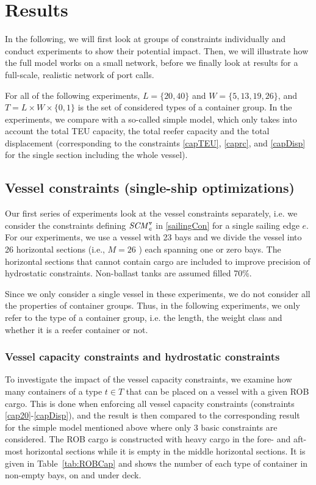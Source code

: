 \section{Results}
In the following, we will first look at groups of constraints individually and conduct experiments to show their potential impact. Then, we will illustrate how the full model works on a small network, before we finally look at results for a full-scale, realistic network of port calls.  

For all of the following experiments, $L=\{20,40\}$ and $W = \{5,13,19,26\}$, and $T=L\times W\times \{0,1\}$ is the set of considered types of a container group. 
In the experiments, we compare with a so-called simple model, which only takes into account the total TEU capacity, the total reefer capacity and the total displacement (corresponding to the constraints \eqref{capTEU}, \eqref{caprc}, and \eqref{capDisp} for the single section including the whole vessel).

\subsection{Vessel constraints (single-ship optimizations)}
Our first series of experiments look at the vessel constraints separately, i.e. we consider the constraints defining $\mathit{SCM}^\texttt{v}_{e}$ in \eqref{sailingCon} for a single sailing edge $e$. 
For our experiments, we use a vessel with 23 bays and we divide the vessel into 26 horizontal sections (i.e., $M = 26$ ) each spanning one or zero bays. The horizontal sections that cannot contain cargo are included to improve precision of hydrostatic constraints. Non-ballast tanks are assumed filled 70\%.

Since we only consider a single vessel in these experiments, we do not consider all the properties of container groups. Thus, in the following experiments, we only refer to the type of a container group, i.e. the length, the weight class and whether it is a reefer container or not. 

\subsubsection{Vessel capacity constraints and hydrostatic constraints}
To investigate the impact of the vessel capacity constraints, we examine how many containers of a type $t\in T$ that can be placed on a vessel with a given ROB cargo. This is done when enforcing all vessel capacity constraints (constraints \eqref{cap20}-\eqref{capDisp}), and the result is then compared to the corresponding result for the simple model mentioned above where only 3 basic constraints are considered.
The ROB cargo is constructed with heavy cargo in the fore- and aft-most horizontal sections while it is empty in the middle horizontal sections. It is given in Table~\ref{tab:ROBCap} and shows the number of each type of container in non-empty bays, on and under deck.

